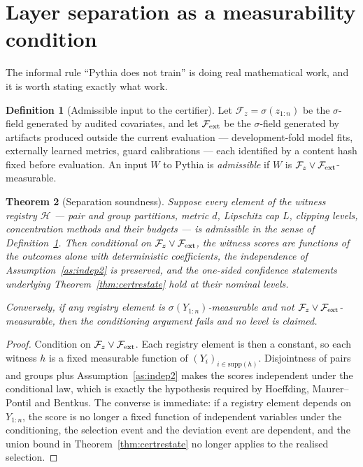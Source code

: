 \documentclass[11pt,a4paper]{article}
\newtheorem{theorem}{Theorem}[section]
\theoremstyle{definition}
\newtheorem{definition}[theorem]{Definition}
\theoremstyle{remark}
\newcommand{\Fcal}{\mathcal{F}}
\newcommand{\Hcal}{\mathcal{H}}
\begin{document}
\section{Layer separation as a measurability condition}\label{sec:sep}

The informal rule ``Pythia does not train'' is doing real mathematical work, and it is worth stating exactly what work.

\begin{definition}[Admissible input to the certifier]\label{def:admissible}
Let $\Fcal_z=\sigma(z_{1:n})$ be the $\sigma$-field generated by audited covariates, and let $\Fcal_{\rm ext}$ be the $\sigma$-field generated by artifacts produced outside the current evaluation --- development-fold model fits, externally learned metrics, guard calibrations --- each identified by a content hash fixed before evaluation. An input $W$ to Pythia is \emph{admissible} if $W$ is $\Fcal_z\vee\Fcal_{\rm ext}$-measurable.
\end{definition}

\begin{theorem}[Separation soundness]\label{thm:sep}
Suppose every element of the witness registry $\Hcal$ --- pair and group partitions, metric $d$, Lipschitz cap $L$, clipping levels, concentration methods and their budgets --- is admissible in the sense of Definition~\ref{def:admissible}. Then conditional on $\Fcal_z\vee\Fcal_{\rm ext}$, the witness scores are functions of the outcomes alone with deterministic coefficients, the independence of Assumption~\ref{as:indep2} is preserved, and the one-sided confidence statements underlying Theorem~\ref{thm:certrestate} hold at their nominal levels.

Conversely, if any registry element is $\sigma(Y_{1:n})$-measurable and not $\Fcal_z\vee\Fcal_{\rm ext}$-measurable, then the conditioning argument fails and no level is claimed.
\end{theorem}

\begin{proof}
Condition on $\Fcal_z\vee\Fcal_{\rm ext}$. Each registry element is then a constant, so each witness $h$ is a fixed measurable function of $(Y_i)_{i\in\mathrm{supp}(h)}$. Disjointness of pairs and groups plus Assumption~\ref{as:indep2} makes the scores independent under the conditional law, which is exactly the hypothesis required by Hoeffding, Maurer--Pontil and Bentkus. The converse is immediate: if a registry element depends on $Y_{1:n}$, the score is no longer a fixed function of independent variables under the conditioning, the selection event and the deviation event are dependent, and the union bound in Theorem~\ref{thm:certrestate} no longer applies to the realised selection.
\end{proof}
\end{document}
